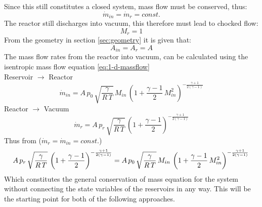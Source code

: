 	\noindent Since this still constitutes a closed system, mass flow must be conserved, thus:
	$$
		\dot{m}_{in} = \dot{m}_r = const.
	$$
	The reactor still discharges into vacuum, this therefore must lead to chocked flow:
	$$
		M_r = 1
	$$
	From the geometry in section \ref{sec:geometry} it is given that:
	$$
		A_{in} = A_r = A
	$$
	The mass flow rates from the reactor into vacuum, can be calculated using the isentropic mass flow equation \eqref{eq:1-d-massflow}\\
	Reservoir $\to$ Reactor
	\begin{equation}
		\dot{m}_{in} = A\, p_0\, \sqrt{\frac{\gamma}{R\,T}}\, M_{in}\,\left(1+\frac{\gamma-1}{2}\,M_{in}^2\right)^{-\frac{\gamma+1}{2(\gamma-1)}}
		\label{eq:massflow-inlet}
	\end{equation}
	Reactor $\to$ Vacuum
	\begin{equation}
		\dot{m}_r = A\, p_r\, \sqrt{\frac{\gamma}{R\,T}}\,\left(1+\frac{\gamma-1}{2}\right)^{-\frac{\gamma+1}{2(\gamma-1)}}
		\label{eq:massflow-outlet}
	\end{equation}
	Thus from ($\dot{m}_r = \dot{m}_{in} = const.$)
	$$
		A\, p_r\, \sqrt{\frac{\gamma}{R\,T}}\,\left(1+\frac{\gamma-1}{2}\right)^{-\frac{\gamma+1}{2(\gamma-1)}}
		=  A\, p_0\, \sqrt{\frac{\gamma}{R\,T}}\, M_{in}\,\left(1+\frac{\gamma-1}{2}\,M_{in}^2\right)^{-\frac{\gamma+1}{2(\gamma-1)}}\\\\
	$$
	Which constitutes the general conservation of mass equation for the system without connecting the state variables of the reservoirs in any way.
	This will be the starting point for both of the following approaches.\\
